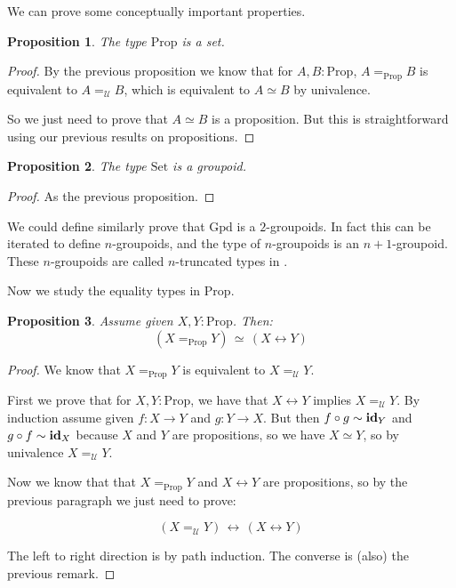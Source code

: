 \documentclass{article}
\newcommand{\U}{{\mathcal U}}
\renewcommand{\r}{\rightarrow}
\newcommand{\id}{\mathrm{\bf id}}
\newcommand{\Set}{\mathrm{Set}}
\newcommand{\Prop}{\mathrm{Prop}}
\newcommand{\Gpd}{\mathrm{Gpd}}
\newtheorem{proposition}{Proposition}
\begin{document}
We can prove some conceptually important properties.

\begin{proposition}
The type $\Prop$ is a set.
\end{proposition}
\begin{proof}
By the previous proposition we know that for $A,B:\Prop$, $A=_\Prop B$ is equivalent to $A=_\U B$, which is equivalent to $A\simeq B$ by univalence.

So we just need to prove that $A\simeq B$ is a proposition. But this is straightforward using our previous results on propositions. %
\end{proof}

\begin{proposition}
The type $\Set$ is a groupoid.
\end{proposition}

\begin{proof}
As the previous proposition.
\end{proof}

We could define similarly prove that $\Gpd$ is a $2$-groupoids. In fact this can be iterated to define $n$-groupoids, and the type of $n$-groupoids is an $n+1$-groupoid. These $n$-groupoids are called $n$-truncated types in \cite{hottbook}.


Now we study the equality types in $\Prop$. %

\begin{proposition}
Assume given $X,Y:\Prop$. Then:
\[(X=_\Prop Y)\, \simeq \, (X\leftrightarrow Y)\]
\end{proposition}
\begin{proof}
We know that $X=_\Prop Y$ is equivalent to $X=_\U Y$. 

First we prove that for $X,Y:\Prop$, we have that $X\leftrightarrow Y$ implies $X=_\U Y$. By induction assume given $f:X\r Y$ and $g: Y\r X$. But then $f\circ g \sim \id_Y$ and $g\circ f\sim \id_X$ because $X$ and $Y$ are propositions, so we have $X\simeq Y$, so by univalence $X=_\U Y$.

Now we know that that $X=_\Prop Y$ and $X\leftrightarrow Y$ are propositions, so by the previous paragraph we just need to prove:

\[(X=_\U Y)\, \leftrightarrow \, (X\leftrightarrow Y)\]

The left to right direction is by path induction. The converse is (also) the previous remark.
\end{proof}
\end{document}
